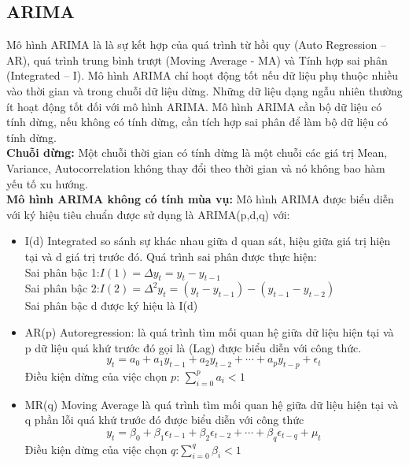 \documentclass[conference]{IEEEtran}
\begin{document}
\subsection{ARIMA}
Mô hình ARIMA là là sự kết hợp của quá trình từ hồi quy (Auto Regression – AR), quá trình trung bình trượt (Moving Average - MA) và Tính hợp sai phân (Integrated – I). Mô hình ARIMA chỉ hoạt động tốt nếu dữ liệu phụ thuộc nhiều vào thời gian và trong chuỗi dữ liệu dừng. Những dữ liệu dạng ngẫu nhiên thường ít hoạt động tốt đối với mô hình ARIMA. Mô hình ARIMA cần bộ dữ liệu có tính dừng, nếu không có tính dừng, cần tích hợp sai phân để làm bộ dữ liệu có tính dừng.\\
\textbf{Chuỗi dừng:} Một chuỗi thời gian có tính dừng  là một chuỗi các giá trị Mean, Variance, Autocorrelation không thay đổi theo thời gian và nó không bao hàm yếu tố xu hướng.\\
\textbf{Mô hình ARIMA không có tính mùa vụ:} 
Mô hình ARIMA được biểu diễn với ký hiệu tiêu chuẩn được sử dụng là ARIMA(p,d,q) với:
\begin{itemize}
    \item I(d) Integrated so sánh sự khác nhau giữa d quan sát, hiệu giữa giá trị hiện tại và d giá trị trước đó. Quá trình sai phân được thực hiện: \\
    Sai phân bậc 1:\(I(1) = \Delta y_t = y_t - y_{t-1}\) \\
    Sai phân bậc 2:\(I(2) = \Delta^2 y_t = (y_t - y_{t-1}) - (y_{t-1} - y_{t-2})\) \\
    Sai phân bậc d được ký hiệu là I(d)
    \item AR(p) Autoregression: là quá trình tìm mối quan hệ giữa dữ liệu hiện tại và p dữ liệu quá khứ trước đó gọi là (Lag) được biểu diễn với công thức. 
    \[y_t = a_0 + a_1 y_{t-1} + a_2 y_{t-2} + \cdots + a_p y_{t-p} + \epsilon_t\]
    Điều kiện dừng của việc chọn \( p \): \(\sum_{i=0}^p a_i < 1\)
    \item MR(q) Moving Average là quá trình tìm mối quan hệ giữa dữ liệu hiện tại và q phần lỗi quá khứ trước đó được biểu diễn với công thức
    \[
    y_t = \beta_0 + \beta_1 \epsilon_{t-1} + \beta_2 \epsilon_{t-2} + \cdots + \beta_q \epsilon_{t-q} + \mu_t
    \]
    Điều kiện dừng của việc chọn \( q \):\(\sum_{i=0}^q \beta_i < 1\)
\end{itemize}
\end{document}
